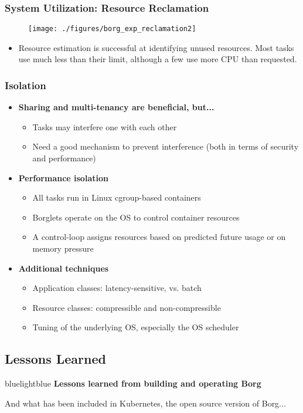 \begin{frame}
\frametitle{System Utilization: Resource Reclamation}
\begin{figure}[h]
  \centering
  \texttt{[image: ./figures/borg\_exp\_reclamation2]}
  \label{fig:borg_exp_reclamation2}
\end{figure}
\begin{itemize}
	\item Resource estimation is successful at identifying unused resources. Most tasks use much less than their limit, although a few use more CPU than requested.
\end{itemize}
\end{frame}

\begin{frame}
\frametitle{Isolation}
\begin{itemize}
	\item {\bf Sharing and multi-tenancy are beneficial, but...}
	\begin{itemize}
		\item Tasks may interfere one with each other
		\item Need a good mechanism to prevent interference (both in terms of security and performance)
	\end{itemize}
	\item {\bf Performance isolation}
	\begin{itemize}
		\item All tasks run in Linux cgroup-based containers
		\item Borglets operate on the OS to control container resources
		\item A control-loop assigns resources based on predicted future usage or on memory pressure
	\end{itemize}
	\item {\bf Additional techniques}
	\begin{itemize}
		\item Application classes: latency-sensitive, vs. batch
		\item Resource classes: compressible and non-compressible
		\item Tuning of the underlying OS, especially the OS scheduler
	\end{itemize}
\end{itemize}
\end{frame}

\subsection{Lessons Learned}
\begin{frame}
 \begin{colorblock}{blue}{lightblue}{ }
    {\Large \textbf{Lessons learned from building and operating Borg}}

    And what has been included in Kubernetes, the open source version of Borg...
  \end{colorblock}
\end{frame}

